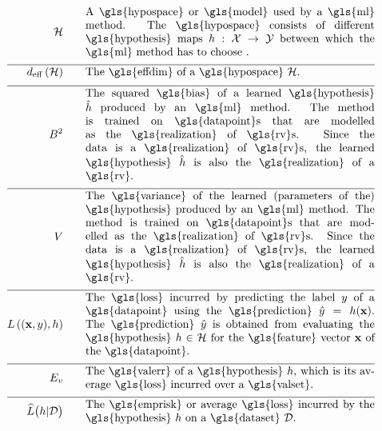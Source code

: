 \begin{align}
	\hypospace  \quad\quad & \parbox{.75\textwidth}{A \gls{hypospace} or \gls{model} used by a \gls{ml} method. 
		The \gls{hypospace} consists of different \gls{hypothesis} maps $\hypothesis: \featurespace \rightarrow \labelspace$ between which 
		the \gls{ml} method has to choose .}   \nonumber \\[2mm] \hline \nonumber\\[-5mm]
	\effdim{\hypospace}  \quad\quad & \parbox{.75\textwidth}{The \gls{effdim} of a \gls{hypospace} $\hypospace$.}   \nonumber \\[2mm] \hline \nonumber\\[-5mm]
	\biasterm^2 \quad\quad &\parbox{.75\textwidth}{
		The squared \gls{bias} of a learned \gls{hypothesis} $\learnthypothesis$ 
		produced by an \gls{ml} method. The method is trained on \gls{datapoint}s 
		that are modelled as the \gls{realization} of \gls{rv}s. Since the data is a \gls{realization} 
		of \gls{rv}s, the learned \gls{hypothesis} $\learnthypothesis$ is also the \gls{realization} 
		of a \gls{rv}.} \nonumber  \nonumber \\[2mm] \hline \nonumber\\[-5mm]
	\varianceterm \quad\quad &\parbox{.75\textwidth}{The \gls{variance} of the learned 
		(parameters of the) \gls{hypothesis} produced by an \gls{ml} method. 
		The method is trained on \gls{datapoint}s that are modelled as the \gls{realization} 
		of \gls{rv}s. Since the data is a \gls{realization} of \gls{rv}s, the learned \gls{hypothesis} $\learnthypothesis$ is also the \gls{realization} 
		of a \gls{rv}.} \nonumber \nonumber \\[2mm] \hline \nonumber\\[-5mm]
	\lossfunc{(\featurevec,\truelabel)}{\hypothesis}  \quad\quad & \parbox{.75\textwidth}{The \gls{loss} incurred by predicting the 
		label $\truelabel$ of a \gls{datapoint} using the \gls{prediction} $\hat{\truelabel}=h(\featurevec)$. The 
		\gls{prediction} $\hat{\truelabel}$ is obtained from evaluating the \gls{hypothesis} $\hypothesis \in \hypospace$ for 
		the \gls{feature} vector $\featurevec$ of the \gls{datapoint}.}    \nonumber  \nonumber \\[2mm] \hline \nonumber\\[-5mm] 
	\valerror \quad\quad &\parbox{.75\textwidth}{The \gls{valerr} of a \gls{hypothesis} $\hypothesis$, which is its 
		average \gls{loss} incurred over a \gls{valset}.}  \nonumber \\[2mm] \hline \nonumber\\[-5mm]
	\emperror\big(\hypothesis| \dataset \big) \quad\quad &\parbox{.75\textwidth}{The \gls{emprisk} or average \gls{loss} 
		incurred by the \gls{hypothesis} $\hypothesis$ on a \gls{dataset} $\dataset$.} \nonumber                           
\end{align}     


